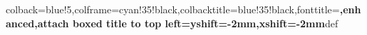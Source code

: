 





\newcommand{\textDelta}{Δ}

\usepackage[skins,theorems]{tcolorbox}
%
{colback=blue!5,colframe=cyan!35!black,colbacktitle=blue!35!black,fonttitle=\bfseries,enhanced,attach boxed title to top left={yshift=-2mm,xshift=-2mm}}{def}


\usepackage{pdfpages}



\newcommand{\red}[1]{\textcolor{red}{#1}}

\newcommand{\green}[1]{\textcolor{green}{#1}}

\newcommand{\blue}[1]{\textcolor{blue}{#1}}